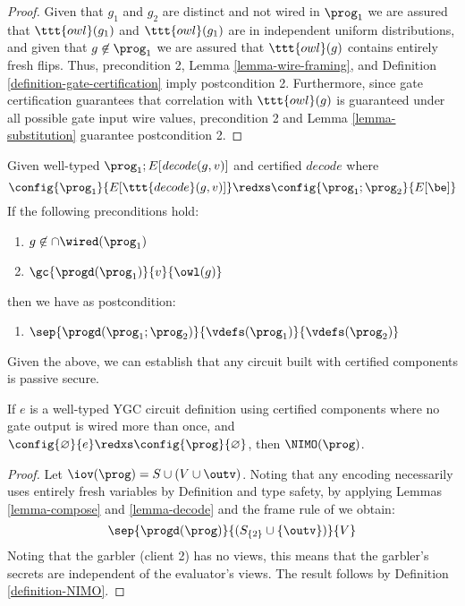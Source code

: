 \begin{proof}
  Given that $g_1$ and $g_2$ are distinct and not wired in $\prog_1$
  we are assured that $\ttt{owl}(g_1)$ and $\ttt{owl}(g_1)$ are in
  independent uniform distributions, and given that $g \not\in
  \prog_1$ we are assured that $\ttt{owl}(g)$ contains entirely fresh
  flips. Thus, precondition 2, Lemma \ref{lemma-wire-framing}, and
  Definition \ref{definition-gate-certification} imply postcondition
  2.  Furthermore, since gate certification guarantees that
  correlation with $\ttt{owl}(g)$ is guaranteed under all possible gate
  input wire values, precondition 2 and Lemma \ref{lemma-substitution}
  guarantee postcondition 2.
\end{proof}

\begin{lemma}
  \label{lemma-decode}
Given well-typed $\prog_1;E[\mathit{decode}(g,v)]$ and certified $\mathit{decode}$ where 
$$
\config{\prog_1}{E[\ttt{decode}(g,v)]} \redxs \config{\prog_1;\prog_2}{E[\be]}
$$
If the following preconditions hold:
\begin{enumerate}
\item $g \not\in \cap \wired(\prog_1)$
\item $\gc{\progd(\prog_1)}{v}{\owl(g)}$
\end{enumerate}
then we have as postcondition:
\begin{enumerate}
  \item $\sep{\progd(\prog_1;\prog_2)}{\vdefs(\prog_1)}{\vdefs(\prog_2)}$
\end{enumerate}
\end{lemma}
Given the above, we can establish that any circuit built with certified
components is passive secure. 
\begin{theorem}
  \label{theorem-ygc-NIMO}
  If $e$ is a well-typed YGC circuit definition using certified components
  where no gate output is wired more than once, and $\config{\varnothing}{e}
  \redxs \config{\prog}{\varnothing}$, then $\NIMO(\prog)$. 
\end{theorem}

\begin{proof}
  Let $\iov(\prog) = S \cup (V \cup \outv)$. Noting that any
  encoding necessarily uses entirely fresh variables by Definition and
  type safety, by applying Lemmas \ref{lemma-compose} and
  \ref{lemma-decode} and the frame rule of
  \cite{barthe2019probabilistic} we obtain:
  $$
  \sep{\progd(\prog)}{(S_{\{2\}}\cup\{\outv\})}{V}
  $$
  Noting that the garbler (client 2) has no views, this means that
  the garbler's secrets are independent of the evaluator's views. The
  result follows by Definition \ref{definition-NIMO}.
\end{proof}


